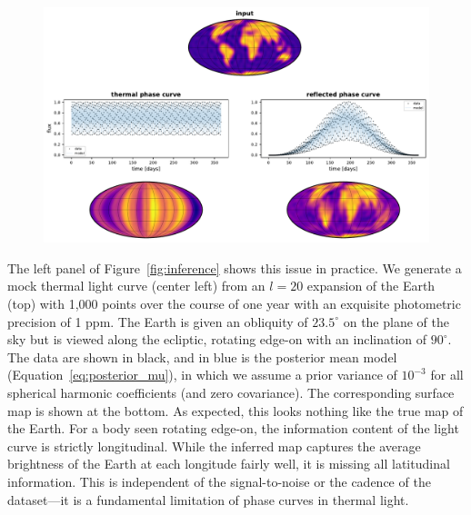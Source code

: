 \documentclass[modern]{aastex62}
\begin{document}
\begin{figure}[t!]
    \begin{centering}
        \includegraphics[width=\linewidth]{figures/inference.pdf}
    \end{centering}
\end{figure}

The left panel of Figure~\ref{fig:inference} shows this issue in practice.
We generate a mock thermal light curve (center left) from an $l = 20$
expansion of the Earth (top) with 1,000 points over the course of one year
with an exquisite photometric precision of 1 ppm. The Earth is given
an obliquity of $23.5^\circ$ on the plane of the sky but is viewed
along the ecliptic, rotating edge-on with an inclination of $90^\circ$.
The data are shown in black, and in blue is the posterior mean model
(Equation~\ref{eq:posterior_mu}),
in which we assume a prior variance of $10^{-3}$ for all spherical
harmonic coefficients (and zero covariance). The corresponding surface
map is shown at the bottom. As expected, this looks nothing like the
true map of the Earth. For a body seen rotating edge-on, the information
content of the light curve is strictly longitudinal. While the
inferred map captures the average brightness of the Earth at each
longitude fairly well, it is missing all latitudinal information.
This is independent of the signal-to-noise or the cadence of the
dataset---it is a fundamental limitation of phase curves in thermal light.
\end{document}
